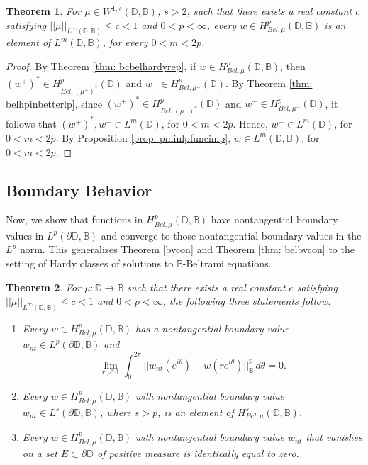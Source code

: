 \documentclass[12pt,reqno]{amsart}
\newtheorem{theorem}{Theorem}[section]
\theoremstyle{definition}
\theoremstyle{remark}
\newcommand{\p}{\partial}
\newcommand{\bc}{\mathbb{B}}
\newcommand{\disk}{\mathbb{D}}
\begin{document}
 
\begin{theorem}\label{thm: bcbelhpinbetterlp}
    For $\mu \in W^{1,s}(\disk,\bc)$, $s>2$, such that there exists a real constant $c$ satisfying $||\mu||_{L^\infty(\disk,\bc)} \leq c < 1$ and $0 < p < \infty$, every $w \in H^p_{Bel,\mu}(\disk,\bc)$ is an element of $L^m(\disk,\bc)$, for every $0 < m < 2p$. 
\end{theorem}

\begin{proof}
By Theorem \ref{thm: bcbelhardyrep}, if $w \in H^p_{Bel,\mu}(\disk,\bc)$, then $(w^+)^* \in H^p_{Bel, (\mu^+)^*}(\disk)$ and $w^- \in H^p_{Bel,\mu^-}(\disk)$. By Theorem \ref{thm: belhpinbetterlp}, since $(w^+)^* \in H^p_{Bel, (\mu^+)^*}(\disk)$ and $w^- \in H^p_{Bel,\mu^-}(\disk)$, it follows that $(w^+)^*,w^- \in L^m(\disk)$, for $0 < m < 2p$. Hence, $w^+ \in L^m (\disk)$, for $0 < m < 2p$. By Proposition \ref{prop: pminlpfuncinlp}, $w \in L^m(\disk, \bc)$, for $0 < m < 2p$. 
\end{proof}



\subsection{Boundary Behavior}

Now, we show that functions in $H^p_{Bel,\mu}(\disk,\bc)$ have nontangential boundary values in $L^p(\p\disk,\bc)$ and converge to those nontangential boundary values in the $L^p$ norm. This generalizes Theorem \ref{bvcon} and Theorem \ref{thm: belbvcon} to the setting of Hardy classes of solutions to $\bc$-Beltrami equations.

    \begin{theorem}\label{thm: bcbelbv}\label{thm: bcbetterbvbetterleb}\label{thm: bczeroonbcimpliesequivzero}
        For $\mu : \disk \to \bc$ such that there exists a real constant $c$ satisfying $||\mu||_{L^\infty(\disk,\bc)} \leq c < 1$ and $0 < p < \infty$, the following three statements follow:
	\begin{enumerate}
		\item Every $w \in H^p_{Bel,\mu}(\disk,\bc)$ has a nontangential boundary value $w_{nt} \in L^p(\p \disk, \bc)$ and
        \[
        \lim_{r \nearrow 1} \int_0^{2\pi} ||w_{nt}(e^{i\theta}) - w(re^{i\theta}) ||^p_{\bc} \, d\theta  = 0. 
    \]  
	\item Every $w \in H^p_{Bel,\mu}(\disk,\bc)$ with nontangential boundary value $w_{nt} \in L^s(\p\disk,\bc)$, where $s>p$, is an element of $H^s_{Bel,\mu}(\disk,\bc)$. 
	\item Every $w \in H^p_{Bel,\mu}(\disk,\bc)$ with nontangential boundary value $w_{nt}$ that vanishes on a set $E \subset \p \disk$ of positive measure is identically equal to zero. 
	\end{enumerate}
    \end{theorem}
\end{document}
